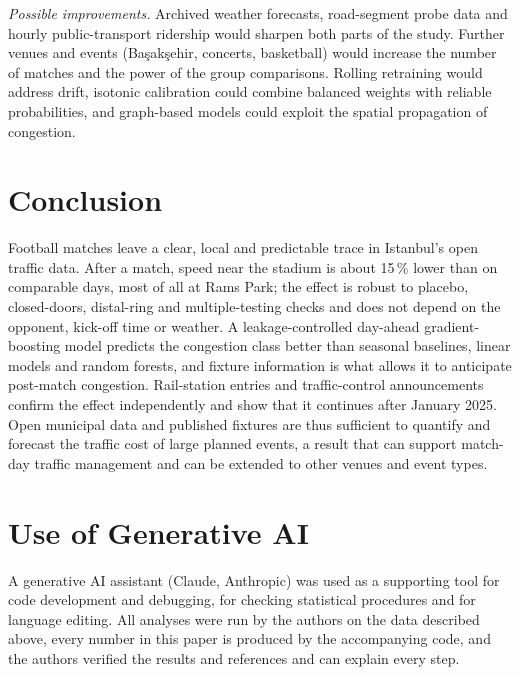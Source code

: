 \documentclass[conference]{IEEEtran}
\begin{document}
\textit{Possible improvements.} Archived weather forecasts, road-segment probe data and hourly public-transport ridership would sharpen both parts of the study. Further venues and events (Ba\c{s}ak\c{s}ehir, concerts, basketball) would increase the number of matches and the power of the group comparisons. Rolling retraining would address drift, isotonic calibration could combine balanced weights with reliable probabilities, and graph-based models \cite{olug2024} could exploit the spatial propagation of congestion.

\section{Conclusion}
Football matches leave a clear, local and predictable trace in Istanbul's open traffic data. After a match, speed near the stadium is about 15\,\% lower than on comparable days, most of all at Rams Park; the effect is robust to placebo, closed-doors, distal-ring and multiple-testing checks and does not depend on the opponent, kick-off time or weather. A leakage-controlled day-ahead gradient-boosting model predicts the congestion class better than seasonal baselines, linear models and random forests, and fixture information is what allows it to anticipate post-match congestion. Rail-station entries and traffic-control announcements confirm the effect independently and show that it continues after January 2025. Open municipal data and published fixtures are thus sufficient to quantify and forecast the traffic cost of large planned events, a result that can support match-day traffic management and can be extended to other venues and event types.

\section*{Use of Generative AI}
A generative AI assistant (Claude, Anthropic) was used as a supporting tool for code development and debugging, for checking statistical procedures and for language editing. All analyses were run by the authors on the data described above, every number in this paper is produced by the accompanying code, and the authors verified the results and references and can explain every step.



\end{document}
